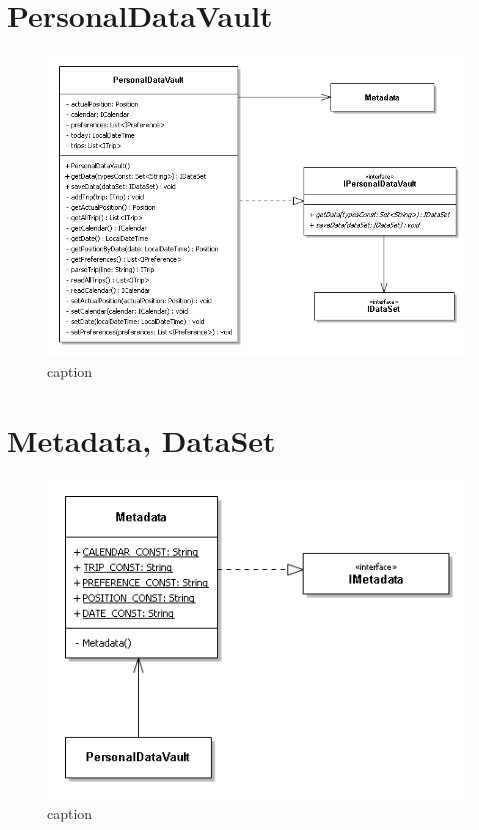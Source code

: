 \section{PersonalDataVault}
\begin{figure} [h]
	\includegraphics[width=\linewidth]{pictures/PersonalDataVault.png}
	\caption{caption}
	\label{fig:PersonalDataVault}
\end{figure}

\section{Metadata, DataSet}
\begin{figure} [h]
	\includegraphics[width=\linewidth]{pictures/Metadata.png}
	\caption{caption}
	\label{fig:Metadata}
\end{figure}

